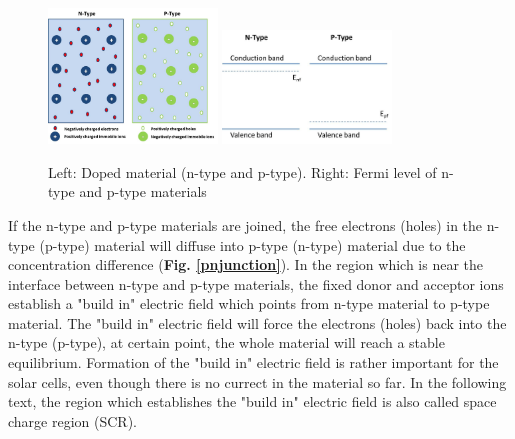 \documentclass[a4paper, 12pt, titlepage,oneside,drop]{kthesis}
\begin{document}


\begin{figure}[H]
    \begin{center}
            \includegraphics[width=0.4\textwidth,clip]{sepratepn.jpg}
            \includegraphics[width=0.4\textwidth,clip]{sepratepn1.jpg}
     \end{center}
    \caption{Left: Doped material (n-type and p-type). Right: Fermi level of n-type and p-type materials}      
    \label{dopedmaterials}
\end{figure}



If the n-type and p-type materials are joined, the free electrons (holes) in the n-type (p-type) material will diffuse into p-type (n-type) material due to the concentration difference (\textbf{Fig. \ref{pnjunction}}). In the region which is near the interface between n-type and
p-type materials, the fixed donor and acceptor ions establish a "build in" electric field which points from n-type material to p-type material. The "build in" electric field will force the electrons (holes) back into the n-type (p-type), at certain
point, the whole material will reach a stable equilibrium. Formation of the "build in" electric field is rather important for the solar cells, even though there is no currect in the material so far. In the following text, the region which establishes
the "build in" electric field is also called space charge region (SCR).

\end{document}
